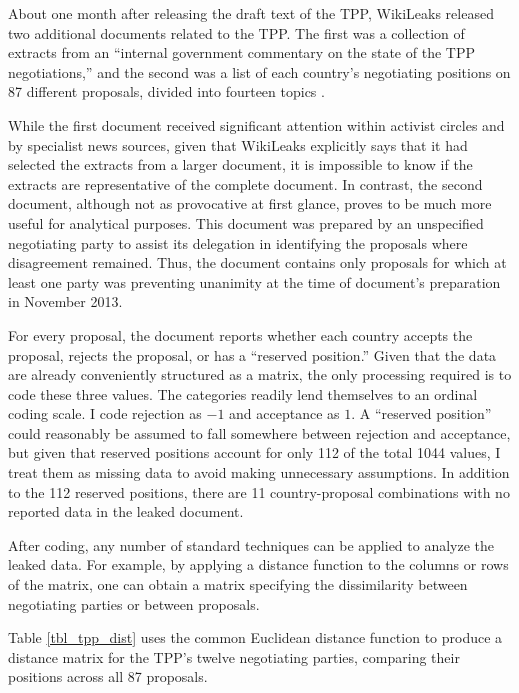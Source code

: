 \documentclass[12pt]{article}
\begin{document}
About one month after releasing the draft text of the TPP, WikiLeaks released two 
additional documents related to the TPP. The first was a collection of extracts from an ``internal 
government commentary on the state of the TPP negotiations,'' and the second was a list of each 
country's negotiating positions on 87 different proposals, divided into fourteen topics \citep{wikileaks2013second}.

While the first document received significant 
attention within activist circles and by specialist news sources, given that WikiLeaks 
explicitly says that it had selected the extracts from a larger document, it is impossible to know if the  
extracts are representative of the complete document. In contrast, the second document, although 
not as provocative at first glance, proves to be much more useful for 
analytical purposes. This document was prepared by an unspecified 
negotiating party to assist its delegation in identifying the proposals where disagreement remained. 
Thus, the document contains only proposals for which at least one party was preventing unanimity at 
the time of document's preparation in November 2013.

For every proposal, the document reports whether each country accepts the proposal, rejects the 
proposal, 
or has a ``reserved position.''	Given that the data are already conveniently structured as a matrix, 
the only processing required is to code these three values. The categories 
readily lend themselves to an ordinal coding scale. I code rejection as $-1$ and acceptance as 
$1$. A ``reserved position'' could reasonably be assumed to fall somewhere between rejection and acceptance, 
but given that reserved positions account for only 112 of the total 1044 values, I treat them as 
missing data to avoid making unnecessary assumptions. In addition to the 112 reserved positions, 
there are 11 country-proposal combinations with no reported data in the leaked document.

After coding, any number of standard techniques can be applied 
to analyze the leaked data. For example, by applying a distance function to the columns or rows of 
the matrix, one can obtain a matrix specifying the dissimilarity between negotiating 
parties or between proposals. 

Table \ref{tbl_tpp_dist} uses the common Euclidean distance function 
to produce a distance matrix for the TPP's twelve negotiating parties, comparing their positions across all 
87 proposals.
\end{document}
